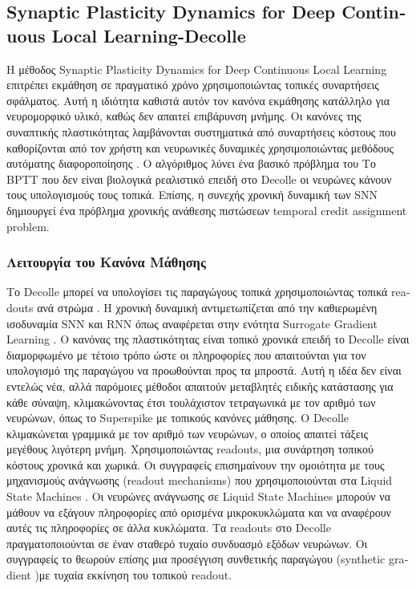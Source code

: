 \documentclass[12pt]{report}
\begin{document}
\subsection{\textlatin{Synaptic Plasticity Dynamics for Deep Continuous Local Learning}-\textlatin{Decolle}}
H μέθοδος \textlatin{Synaptic Plasticity Dynamics for Deep Continuous Local Learning} \cite{kaiser2020} επιτρέπει εκμάθηση σε πραγματικό χρόνο χρησιμοποιώντας τοπικές συναρτήσεις σφάλματος. Αυτή η ιδιότητα καθιστά αυτόν τον κανόνα εκμάθησης κατάλληλο για νευρομορφικό υλικό, καθώς δεν απαιτεί επιβάρυνση μνήμης. Οι κανόνες της συναπτικής πλαστικότητας λαμβάνονται συστηματικά από συναρτήσεις κόστους που καθορίζονται από τον χρήστη και νευρωνικές δυναμικές χρησιμοποιώντας μεθόδους αυτόματης διαφοροποίησης . Ο αλγόριθμος λύνει ένα βασικό πρόβλημα του Το \textlatin{BPTT} που δεν είναι βιολογικά ρεαλιστικό επειδή στο \textlatin{Decolle} οι νευρώνες κάνουν τους υπολογισμούς τους τοπικά. Επίσης, η συνεχής χρονική δυναμική των SNN δημιουργεί ένα πρόβλημα χρονικής ανάθεσης πιστώσεων \textlatin{temporal credit assignment problem}.
\subsubsection{Λειτουργία του Κανόνα Μάθησης}
Το Decolle μπορεί να υπολογίσει τις παραγώγους τοπικά χρησιμοποιώντας τοπικά \textlatin{readouts } ανά στρώμα \cite{neftci2017}. Η χρονική δυναμική αντιμετωπίζεται από την καθιερωμένη ισοδυναμία \textlatin{SNN} και \textlatin{RNN} όπως αναφέρεται στην ενότητα Surrogate Gradient Learning \cite{neftci2019}. Ο κανόνας της πλαστικότητας είναι τοπικό χρονικά επειδή το \textlatin{Decolle} είναι διαμορφωμένο με τέτοιο τρόπο ώστε οι πληροφορίες που απαιτούνται για τον υπολογισμό της παραγώγου να προωθούνται προς τα μπροστά. Αυτή η ιδέα δεν είναι εντελώς νέα, αλλά παρόμοιες μέθοδοι απαιτούν μεταβλητές ειδικής κατάστασης για κάθε σύναψη, κλιμακώνοντας έτσι τουλάχιστον τετραγωνικά με τον αριθμό των νευρώνων, όπως το \textlatin{Superspike} με τοπικούς κανόνες μάθησης. Ο \textlatin{Decolle} κλιμακώνεται γραμμικά με τον αριθμό των νευρώνων, ο οποίος απαιτεί τάξεις μεγέθους λιγότερη μνήμη. Χρησιμοποιώντας \textlatin{readouts}, μια συνάρτηση τοπικού κόστους χρονικά και χωρικά. Οι συγγραφείς επισημαίνουν την ομοιότητα με τους μηχανισμούς ανάγνωσης (\textlatin{readout mechanisms}) που χρησιμοποιούνται στα \textlatin{ Liquid State Machines} \cite{markram2002}. Οι νευρώνες ανάγνωσης σε \textlatin{ Liquid State Machines} μπορούν να μάθουν να εξάγουν πληροφορίες από ορισμένα μικροκυκλώματα και να αναφέρουν αυτές τις πληροφορίες σε άλλα κυκλώματα. Τα \textlatin{readouts} στο \textlatin{Decolle} πραγματοποιούνται σε έναν σταθερό τυχαίο συνδυασμό εξόδων νευρώνων. Οι συγγραφείς το θεωρούν επίσης μια προσέγγιση συνθετικής παραγώγου (\textlatin{synthetic gradient })με τυχαία εκκίνηση του τοπικού \textlatin{readout}.
\end{document}
